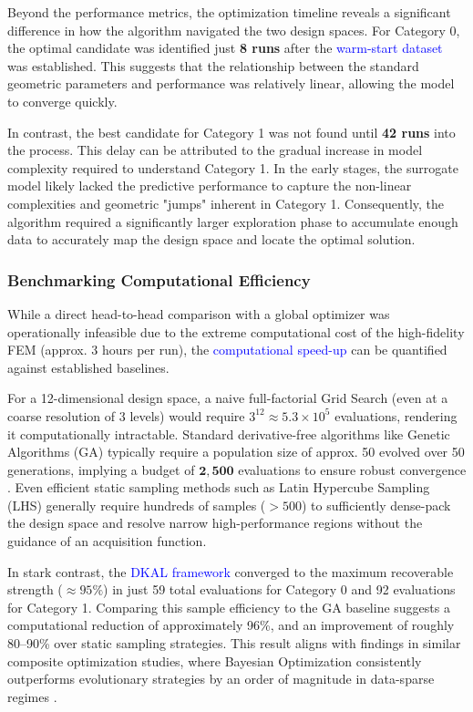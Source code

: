 \documentclass[
  preprint,
  12pt,
  a4paper
]{elsarticle}
\newcommand{\new}[1]{\textcolor{blue}{#1}}
\begin{document}
Beyond the performance metrics, the optimization timeline reveals a significant difference in how the algorithm navigated the two design spaces. For Category 0, the optimal candidate was identified just \textbf{8 runs} after the \new{warm-start dataset} was established. This suggests that the relationship between the standard geometric parameters and performance was relatively linear, allowing the model to converge quickly.

In contrast, the best candidate for Category 1 was not found until \textbf{42 runs} into the process. This delay can be attributed to the gradual increase in model complexity required to understand Category 1. In the early stages, the surrogate model likely lacked the predictive performance to capture the non-linear complexities and geometric "jumps" inherent in Category 1. Consequently, the algorithm required a significantly larger exploration phase to accumulate enough data to accurately map the design space and locate the optimal solution.

\subsubsection{Benchmarking Computational Efficiency}
While a direct head-to-head comparison with a global optimizer was operationally infeasible due to the extreme computational cost of the high-fidelity FEM (approx. 3 hours per run), the \new{computational speed-up} can be quantified against established baselines. 

For a 12-dimensional design space, a naive full-factorial Grid Search (even at a coarse resolution of 3 levels) would require $3^{12} \approx 5.3 \times 10^5$ evaluations, rendering it computationally intractable. Standard derivative-free algorithms like Genetic Algorithms (GA) typically require a population size of approx. 50 evolved over 50 generations, implying a budget of $\mathbf{2,500}$ evaluations to ensure robust convergence \cite{queipo2005surrogate}. Even efficient static sampling methods such as Latin Hypercube Sampling (LHS) generally require hundreds of samples ($>500$) to sufficiently dense-pack the design space and resolve narrow high-performance regions without the guidance of an acquisition function.

In stark contrast, the \new{DKAL framework} converged to the maximum recoverable strength ($\approx 95\%$) in just 59 total evaluations for Category 0 and 92 evaluations for Category 1. Comparing this sample efficiency to the GA baseline suggests a computational reduction of approximately 96\%, and an improvement of roughly 80--90\% over static sampling strategies. This result aligns with findings in similar composite optimization studies, where Bayesian Optimization consistently outperforms evolutionary strategies by an order of magnitude in data-sparse regimes \cite{ghosh2023digital}.
\end{document}
